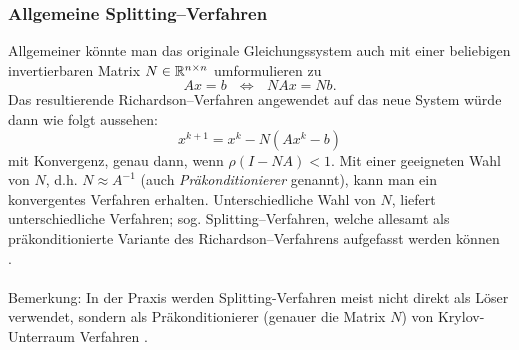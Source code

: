 \subsubsection{Allgemeine Splitting--Verfahren}
Allgemeiner könnte man das originale Gleichungssystem auch mit einer beliebigen invertierbaren Matrix $N \in {\mathbb{R}}^{n\times n}$ umformulieren zu
$$ Ax = b ~~~\Leftrightarrow~~~N Ax =  Nb.$$
Das resultierende Richardson--Verfahren angewendet auf das neue System würde dann wie folgt aussehen:
$$x^{k+1} = x^k -  N(Ax^k-b) $$
mit Konvergenz, genau dann, wenn $\rho(I-NA)<1$. Mit einer geeigneten Wahl von $N$, d.h. $N \approx A^{-1}$ (auch \textit{Präkonditionierer} genannt), kann man ein konvergentes Verfahren erhalten. Unterschiedliche Wahl von $N$, liefert unterschiedliche Verfahren; sog. Splitting--Verfahren, welche allesamt als präkonditionierte Variante des Richardson--Verfahrens aufgefasst werden können \cite[Kap. 4.1]{Meister}.~\\~\\
Bemerkung: In der Praxis werden Splitting-Verfahren meist nicht direkt als Löser verwendet, sondern als Präkonditionierer (genauer die Matrix $N$) von Krylov-Unterraum Verfahren \cite[Kap. 5.3]{Meister}.






